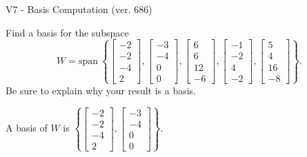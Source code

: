 \begin{exercise}
  \begin{exerciseTitle}V7 - Basis Computation (ver. 686)\end{exerciseTitle}
  \begin{exerciseStatement}
    Find a basis for the subspace 
\[W=\mathrm{span}\ \left\{\left[\begin{array}{r}
-2 \\
-2 \\
-4 \\
2
\end{array}\right] , \left[\begin{array}{r}
-3 \\
-4 \\
0 \\
0
\end{array}\right] , \left[\begin{array}{r}
6 \\
6 \\
12 \\
-6
\end{array}\right] , \left[\begin{array}{r}
-1 \\
-2 \\
4 \\
-2
\end{array}\right] , \left[\begin{array}{r}
5 \\
4 \\
16 \\
-8
\end{array}\right]\right\}.\]
 Be sure to explain why your result is a basis.


  \end{exerciseStatement}
  \begin{exerciseAnswer}
   A basis of \(W\) is  \(\left\{\left[\begin{array}{r}
-2 \\
-2 \\
-4 \\
2
\end{array}\right] , \left[\begin{array}{r}
-3 \\
-4 \\
0 \\
0
\end{array}\right]\right\}\).
  


  \end{exerciseAnswer}
\end{exercise}